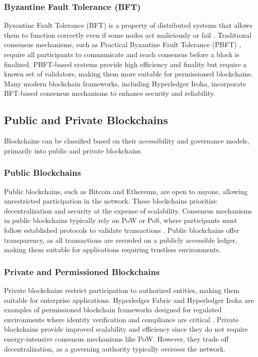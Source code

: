 \documentclass{article}
\begin{document}
\subsubsection{Byzantine Fault Tolerance (BFT)}
Byzantine Fault Tolerance (BFT) is a property of distributed systems that allows them to function correctly even if some nodes act maliciously or fail \cite{lamport1982byzantine}. Traditional consensus mechanisms, such as Practical Byzantine Fault Tolerance (PBFT) \cite{castro1999practical}, require all participants to communicate and reach consensus before a block is finalized. PBFT-based systems provide high efficiency and finality but require a known set of validators, making them more suitable for permissioned blockchains. Many modern blockchain frameworks, including Hyperledger Iroha, incorporate BFT-based consensus mechanisms to enhance security and reliability.

\subsection{Public and Private Blockchains}

Blockchains can be classified based on their accessibility and governance models, primarily into public and private blockchains.

\subsubsection{Public Blockchains}
Public blockchains, such as Bitcoin and Ethereum, are open to anyone, allowing unrestricted participation in the network. These blockchains prioritize decentralization and security at the expense of scalability. Consensus mechanisms in public blockchains typically rely on PoW or PoS, where participants must follow established protocols to validate transactions \cite{buterin2014next}. Public blockchains offer transparency, as all transactions are recorded on a publicly accessible ledger, making them suitable for applications requiring trustless environments.

\subsubsection{Private and Permissioned Blockchains}
Private blockchains restrict participation to authorized entities, making them suitable for enterprise applications. Hyperledger Fabric and Hyperledger Iroha are examples of permissioned blockchain frameworks designed for regulated environments where identity verification and compliance are critical \cite{androulaki2018hyperledger}. Private blockchains provide improved scalability and efficiency since they do not require energy-intensive consensus mechanisms like PoW. However, they trade off decentralization, as a governing authority typically oversees the network.
\end{document}
